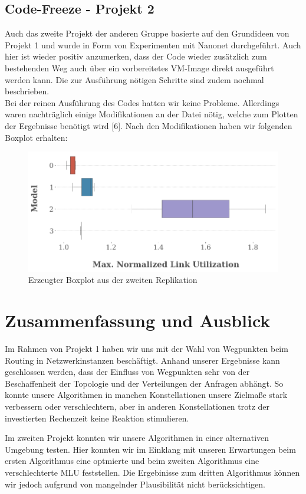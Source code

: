 \documentclass[sigconf,noacm,review]{acmart}
\begin{document}
\subsection{Code-Freeze - Projekt 2}
Auch das zweite Projekt der anderen Gruppe basierte auf den Grundideen von Projekt 1 und wurde in Form von Experimenten mit Nanonet durchgeführt. Auch hier ist wieder positiv anzumerken, dass der Code wieder zusätzlich zum bestehenden Weg auch über ein vorbereitetes VM-Image direkt ausgeführt werden kann. Die zur Ausführung nötigen Schritte sind zudem nochmal beschrieben. \\
Bei der reinen Ausführung des Codes hatten wir keine Probleme. Allerdings waren nachträglich einige Modifikationen an der Datei nötig, welche zum Plotten der Ergebnisse benötigt wird [6]. Nach den Modifikationen haben wir folgenden Boxplot erhalten:
\begin{figure}[h]
  \centering
  \includegraphics[width=\linewidth]{abbildungen/boxplot}
  \caption{Erzeugter Boxplot aus der zweiten Replikation}
\end{figure}

\section{Zusammenfassung und Ausblick}
Im Rahmen von Projekt 1 haben wir uns mit der Wahl von Wegpunkten beim Routing in Netzwerkinstanzen beschäftigt. Anhand unserer Ergebnisse kann geschlossen werden, dass der Einfluss von Wegpunkten sehr von der Beschaffenheit der Topologie und der Verteilungen der Anfragen abhängt. So konnte unsere Algorithmen in manchen Konstellationen unsere Zielmaße stark verbessern oder verschlechtern, aber in anderen Konstellationen trotz der investierten Rechenzeit keine Reaktion stimulieren.

Im zweiten Projekt konnten wir unsere Algorithmen in einer alternativen Umgebung testen. Hier konnten wir im Einklang mit unseren Erwartungen beim ersten Algorithmus eine optmierte und beim zweiten Algorithmus eine verschlechterte MLU feststellen. Die Ergebinisse zum dritten Algorithmus können wir jedoch aufgrund von mangelnder Plausibilität nicht berücksichtigen.
\end{document}
